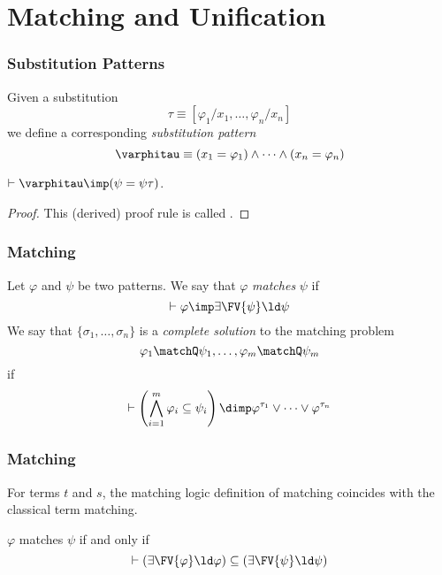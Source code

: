 \section{Matching and Unification}

\begin{frame}

\frametitle{Substitution Patterns}

\begin{definition}
Given a substitution
\[\tau \equiv [\varphi_1 / x_1 , \dots , \varphi_n / x_n] \]
we define a corresponding \emph{substitution pattern}
\[\varphitau \equiv (x_1 = \varphi_1) \land \dots \land (x_n = \varphi_n) \]
\end{definition}

\begin{lemma}
$\vdash \varphitau \imp (\psi = \psi\tau)$.
\end{lemma}
\begin{proof}
This (derived) proof rule is called . 
\end{proof}
\end{frame}

\begin{frame}

\frametitle{Matching}

\begin{definition}
\label{def:matching}
Let $\varphi$ and $\psi$ be two patterns. 
We say that $\varphi$ \emph{matches} $\psi$
if
\[\vdash \varphi \imp \exists \FV{\psi} \ld \psi \]
We say that $\{\sigma_1,\dots,\sigma_n\}$ is a \emph{complete solution}
to the matching problem
\[\varphi_1 \matchQ \psi_1, \dots, \varphi_m \matchQ \psi_m\] if
\[\vdash \left(\bigwedge_{i=1}^m \varphi_i \subseteq \psi_i \right)
  \dimp \varphi^{\tau_1} \lor \dots \lor \varphi^{\tau_n}
\]
\end{definition}

\end{frame}

\begin{frame}

\frametitle{Matching}
\begin{lemma}
For terms $t$ and $s$,
the matching logic definition of matching
coincides with the classical term matching.
\end{lemma}

\begin{lemma}
$\varphi$ matches $\psi$ if and only if
\[\vdash \left(\exists \FV{\varphi} \ld \varphi\right)
  \subseteq \left(\exists \FV{\psi} \ld \psi\right)
\]
\end{lemma}

\end{frame}


